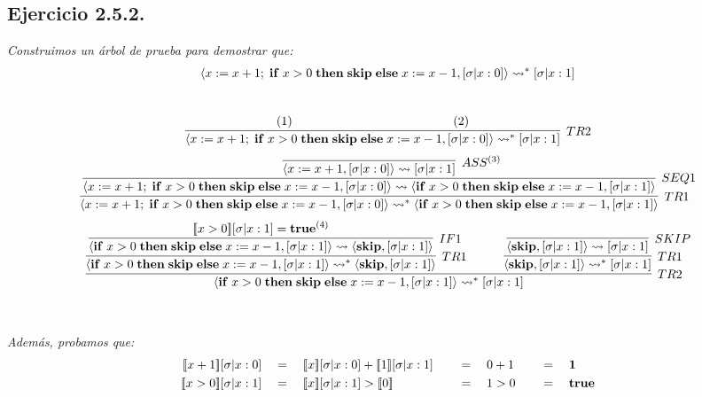 \documentclass[a4paper,10pt]{article}
\begin{document}
\subsection*{Ejercicio 2.5.2.}
	\emph{Construimos un árbol de prueba para demostrar que:}
	\\
	\begin{align*}
		\langle x:= x+1;\;{\bf if}\; x>0\;{\bf then\;skip\;else}\; x:=x-1, [\sigma|x:0]\rangle \rightsquigarrow^*[\sigma|x:1]
	\end{align*}
	\\
	\begin{align*}
		\infer[TR2]{
			\langle x:= x+1;\;{\bf if}\; x>0\;{\bf then\;skip\;else}\; x:=x-1, [\sigma|x:0]\rangle \rightsquigarrow^*[\sigma|x:1]
		}{
			(1)\qquad \qquad \qquad & \qquad \qquad \qquad(2)
		}
	\end{align*}
	\begin{align}
		\infer[TR1]{
			\langle x:= x+1;\;{\bf if}\; x>0\;{\bf then\;skip\;else}\; x:=x-1, [\sigma|x:0]\rangle \rightsquigarrow^* \langle {\bf if}\; x>0\;{\bf then\;skip\;else}\; x:=x-1, [\sigma|x:1]\rangle
		}{
			\infer[SEQ1]{
				\langle x:= x+1;\;{\bf if}\; x>0\;{\bf then\;skip\;else}\; x:=x-1, [\sigma|x:0]\rangle \rightsquigarrow \langle {\bf if}\; x>0\;{\bf then\;skip\;else}\; x:=x-1, [\sigma|x:1]\rangle
			}{
				\infer[ASS^{(3)}]{
					\langle x:= x+1, [\sigma|x:0] \rangle \rightsquigarrow [\sigma|x:1]
				}{
				}
			}
		}
	\end{align}
	\begin{align}
		\infer[TR2]{
			\langle {\bf if}\; x>0\;{\bf then\;skip\;else}\; x:=x-1, [\sigma|x:1]\rangle \rightsquigarrow^* [\sigma|x:1]
		}{
			\infer[TR1]{
				\langle {\bf if}\; x>0\;{\bf then\;skip\;else}\; x:=x-1, [\sigma|x:1]\rangle \rightsquigarrow^* \langle {\bf skip}, [\sigma|x:1]\rangle
			}{
				\infer[IF1]{
					\langle {\bf if}\; x>0\;{\bf then\;skip\;else}\; x:=x-1, [\sigma|x:1]\rangle \rightsquigarrow \langle {\bf skip}, [\sigma|x:1]\rangle
				}{
					[\![x>0]\!][\sigma|x:1] = {\bf true}^{(4)}
				}
			} & \qquad
			\infer[TR1]{
				\langle {\bf skip}, [\sigma|x:1]\rangle \rightsquigarrow^* [\sigma|x:1]
			}{
				\infer[SKIP]{
					\langle {\bf skip}, [\sigma|x:1]\rangle \rightsquigarrow [\sigma|x:1]
				}{
				}
			}
		}
	\end{align}
	\\
	\\
	\emph{Además, probamos que:}
	\begin{alignat}{3}
		[\![x+1]\!][\sigma|x:0] \quad &= \quad [\![x]\!][\sigma|x:0] + [\![1]\!][\sigma|x:1] \quad &&= \quad 0+1 \quad &&= \quad {\bf 1}\\
	  	[\![x>0]\!][\sigma|x:1] \quad &= \quad [\![x]\!][\sigma|x:1] > [\![0]\!] \quad &&= \quad 1>0 \quad &&= \quad {\bf true}
	\end{alignat}
	\\
\end{document}
